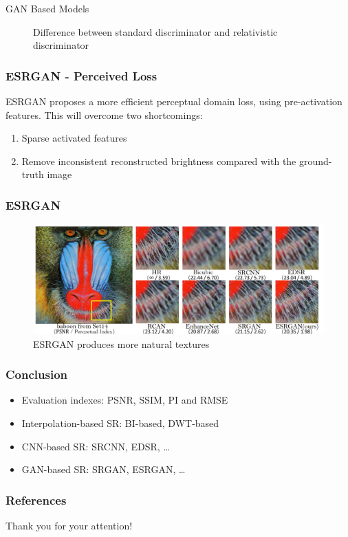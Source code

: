 \documentclass[11pt, presentation]{beamer}
\begin{document}
\begin{section}{GAN Based Models}
\begin{frame}
\begin{figure}
                \caption{Difference between standard discriminator and relativistic discriminator~\cite{wang2018}}
                \label{fig:esrgan-discriminator}
            \end{figure}
        \end{frame}
        \begin{frame}
            \frametitle{ESRGAN - Perceived Loss}
            ESRGAN proposes a more efficient perceptual domain loss,
            using pre-activation features.
            This will overcome two shortcomings:
            \begin{enumerate}
                \item Sparse activated features
                \item Remove inconsistent reconstructed brightness compared with the ground-truth image
            \end{enumerate}
        \end{frame}
        \begin{frame}
            \frametitle{ESRGAN}
            \begin{figure}
                \includegraphics[width=\textwidth]{images/esrgan-baboon}
                \caption{ESRGAN produces more natural textures~\cite{wang2018}}
                \label{fig:esrgan-comparison}
            \end{figure}
        \end{frame}
    \end{section}
    \begin{frame}
        \frametitle{Conclusion}
        \begin{itemize}
            \item Evaluation indexes: PSNR, SSIM, PI and RMSE
            \item Interpolation-based SR: BI-based, DWT-based
            \item CNN-based SR: SRCNN, EDSR, \ldots
            \item GAN-based SR: SRGAN, ESRGAN, \ldots
        \end{itemize}
    \end{frame}
    \begin{frame}[t, allowframebreaks]
        \frametitle{References}
        
        
    \end{frame}
    \begin{frame}[standout]
	Thank you for your attention!
    \end{frame}
\end{document}
